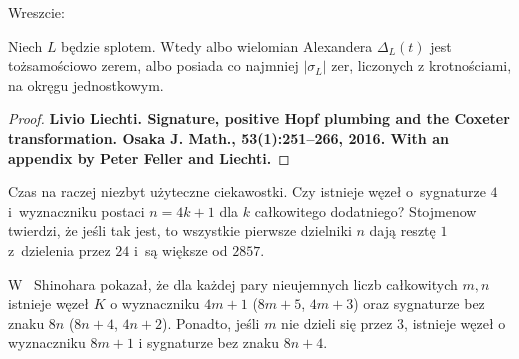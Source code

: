 Wreszcie:

\begin{proposition}
    Niech $L$ będzie splotem.
    Wtedy albo wielomian Alexandera $\Delta_L(t)$ jest tożsamościowo zerem, albo posiada co najmniej $|\sigma_L|$ zer, liczonych z krotnościami, na okręgu jednostkowym.
\end{proposition}

\begin{proof}
    \textbf{Livio Liechti. Signature, positive Hopf plumbing and the Coxeter transformation. Osaka J.
Math., 53(1):251–266, 2016. With an appendix by Peter Feller and Liechti.}
\end{proof}

Czas na raczej niezbyt użyteczne ciekawostki.
Czy istnieje węzeł o~sygnaturze $4$ i~wyznaczniku postaci $n = 4k + 1$ dla $k$ całkowitego dodatniego?
Stojmenow twierdzi, że jeśli tak jest, to wszystkie pierwsze dzielniki $n$ dają resztę $1$ z~dzielenia przez $24$ i~są większe od $2857$.


W~\cite{shinohara71} Shinohara pokazał, że dla każdej pary nieujemnych liczb całkowitych $m, n$ istnieje węzeł $K$ o wyznaczniku $4m+1$ ($8m+5$, $4m+3$) oraz sygnaturze bez znaku $8n$ ($8n+4$, $4n+2$).
Ponadto, jeśli $m$ nie dzieli się przez $3$, istnieje węzeł o wyznaczniku $8m+1$ i sygnaturze bez znaku $8n+4$.

